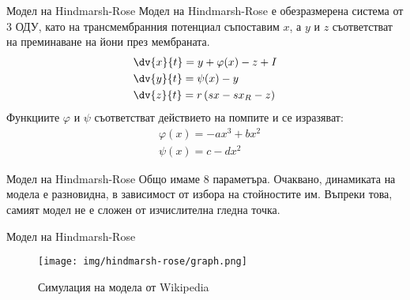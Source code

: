 \begin{frame}[t]{Модел на Hindmarsh-Rose}
    Модел на Hindmarsh-Rose е обезразмерена система от 3 ОДУ, 
    като на трансмембранния потенциал съпоставим $x$,
    а $y$ и $z$ съответстват на преминаване на йони през мембраната.
    \begin{align*}
        &\dv{x}{t}=y + \varphi(x) - z + I\\
        &\dv{y}{t}=\psi(x) - y\\
        &\dv{z}{t}=r\left(sx - sx_R - z\right)
    \end{align*}
    Функциите $\varphi$ и $\psi$ съответстват действието на помпите и се изразяват:
    \begin{align*}
        &\varphi(x) = -ax^3 + bx^2\\
        &\psi(x) = c - dx^2
    \end{align*}
\end{frame}

\begin{frame}[t]{Модел на Hindmarsh-Rose}
    Общо имаме 8 параметъра. Очаквано, динамиката на модела е разновидна, в зависимост от избора на стойностите им.
    Въпреки това, самият модел не е сложен от изчислителна гледна точка.
\end{frame}

\begin{frame}[t]{Модел на Hindmarsh-Rose}
    \begin{figure}[htbp!]
        \centering
        \texttt{[image: img/hindmarsh-rose/graph.png]}
        \caption{Симулация на модела от Wikipedia}
    \end{figure}
\end{frame}